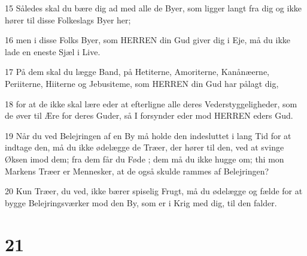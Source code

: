 \par 15 Således skal du bære dig ad med alle de Byer, som ligger langt fra dig og ikke hører til disse Folkeslags Byer her;
\par 16 men i disse Folks Byer, som HERREN din Gud giver dig i Eje, må du ikke lade en eneste Sjæl i Live.
\par 17 På dem skal du lægge Band, på Hetiterne, Amoriterne, Kanånæerne, Periiterne, Hiiterne og Jebusiteme, som HERREN din Gud har pålagt dig,
\par 18 for at de ikke skal lære eder at efterligne alle deres Vederstyggeligheder, som de øver til Ære for deres Guder, så I forsynder eder mod HERREN eders Gud.
\par 19 Når du ved Belejringen af en By må holde den indesluttet i lang Tid for at indtage den, må du ikke ødelægge de Træer, der hører til den, ved at svinge Øksen imod dem; fra dem får du Føde ; dem må du ikke hugge om; thi mon Markens Træer er Mennesker, at de også skulde rammes af Belejringen?
\par 20 Kun Træer, du ved, ikke bærer spiselig Frugt, må du ødelægge og fælde for at bygge Belejringsværker mod den By, som er i Krig med dig, til den falder.

\chapter{21}

